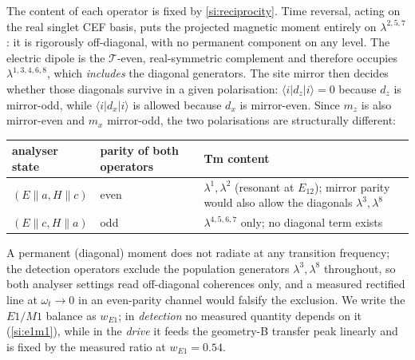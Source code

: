 \documentclass[11pt]{article}
\newcommand{\ket}[1]{|#1\rangle}
\newcommand{\bra}[1]{\langle #1|}
\begin{document}
The content of each operator is fixed by \cref{si:reciprocity}.  Time
reversal, acting on the real singlet CEF basis, puts the projected
magnetic moment entirely on $\lambda^{2,5,7}$: it is rigorously
off-diagonal, with no permanent component on any level.  The electric
dipole is the $\mathcal T$-even, real-symmetric complement and therefore
occupies $\lambda^{1,3,4,6,8}$, which \emph{includes} the diagonal
generators.  The site mirror then decides whether those diagonals
survive in a given polarisation: $\bra id_z\ket i=0$ because $d_z$ is
mirror-odd, while $\bra id_x\ket i$ is allowed because $d_x$ is
mirror-even.  Since $m_z$ is also mirror-even and $m_x$ mirror-odd, the
two polarisations are structurally different:
\begin{center}\small
\renewcommand{\arraystretch}{1.3}
\begin{tabular}{lll}
\toprule
analyser state & parity of both operators & Tm content\\
\midrule
$(E\!\parallel\!a,H\!\parallel\!c)$ & even & $\lambda^1,\lambda^2$
  (resonant at $E_{12}$); mirror parity would also allow the diagonals
  $\lambda^3,\lambda^8$\\
$(E\!\parallel\!c,H\!\parallel\!a)$ & odd & $\lambda^{4,5,6,7}$ only;
  no diagonal term exists\\
\bottomrule
\end{tabular}
\end{center}
A permanent (diagonal) moment does not radiate at any transition
frequency; the detection operators exclude the population generators
$\lambda^{3},\lambda^8$ throughout, so both analyser settings read
off-diagonal coherences only, and a measured rectified line at
$\omega_t\!\to\!0$ in an even-parity channel would falsify the
exclusion.  We write the $E1/M1$ balance as $w_{E1}$; in
\emph{detection} no measured quantity depends on it (\cref{si:e1m1}),
while in the \emph{drive} it feeds the geometry-B transfer peak
linearly and is fixed by the measured ratio at $w_{E1}=0.54$.
\end{document}
